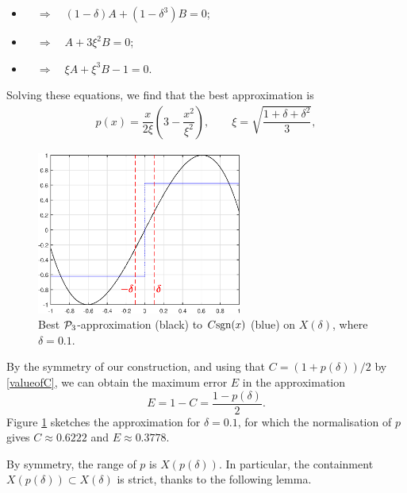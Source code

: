 \begin{itemize}
    \item{} $\quad\Longrightarrow \quad (1-\delta)A+(1-\delta^3)B=0$;
    \item{} $\quad\Longrightarrow \quad A+3\xi^2B=0$;
    \item{} $\quad\Longrightarrow \quad \xi A + \xi^3 B-1=0$.
\end{itemize}

Solving these equations, we find that the best approximation is
\begin{align}
     p(x)=\dfrac{x}{2\xi}\left(3-\dfrac{x^2}{\xi^2}\right), \qquad \xi=\sqrt{\dfrac{1+\delta+\delta^2}{3}},\label{xis}
\end{align}

\begin{figure}[t!]
\centering
   \includegraphics[width=0.6\textwidth,height=0.6\textheight,keepaspectratio]{figures/chapter_3/COMPSIGNsingle.eps}
   \caption{Best $\mathcal{P}_3$-approximation (black) to $C\text{sgn}(x)$ (blue) on $X(\delta)$, where $\delta=0.1$.}
   \label{fig:compsign}
\end{figure}

By the symmetry of our construction, and using that $C=(1+p(\delta))/2$ by \eqref{valueofC}, we can obtain the maximum error $E$ in the approximation
\[E=1-C=\dfrac{1-p(\delta)}{2}.\]
Figure \ref{fig:compsign} sketches the approximation for $\delta=0.1$, for which the normalisation of $p$ gives $C\approx 0.6222$ and $E\approx 0.3778$.

\bigskip{}

\begin{rmk}
By symmetry, the range of $p$ is $X(p(\delta))$. In particular, the containment $X(p(\delta)) \subset X(\delta)$ is strict, thanks to the following lemma.
\end{rmk}

